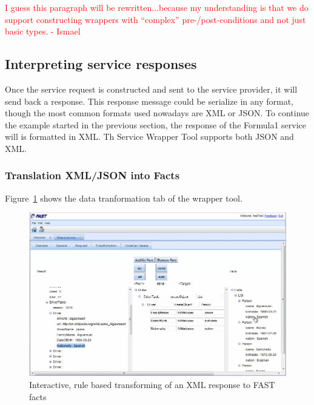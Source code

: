 \documentclass{fast_latex}
\begin{document}
\textcolor{red}{I guess this paragraph will be rewritten...because my understanding is that we do support constructing wrappers with ``complex'' pre-/post-conditions and not just basic types. - Ismael}



\subsection{Interpreting service responses} %
\label{sub:interpreting_service_responses}

Once the service request is constructed and sent to the service provider, it will send back a response. This response message could be serialize in any format, though the most common formats used nowadays are XML or JSON. To continue the example started in the previous section, the response of the Formula1 service will is formatted in XML. Th Service Wrapper Tool supports both JSON and XML.

\subsubsection{Translation XML/JSON into Facts} %
\label{ssub:translation_xml_into_facts}

Figure~\ref{fig:response_service_execution} shows the data tranformation tab of the wrapper tool. 

\begin{figure}
  \begin{center}
      \includegraphics[angle=90,width=0.8\linewidth]{images/ServiceWrapperToolGVSWithTransformationRulesF1.png}
    \caption{Interactive, rule based transforming of an XML response to FAST facts}
    \label{fig:response_service_execution}
  \end{center}
\end{figure}
\end{document}
